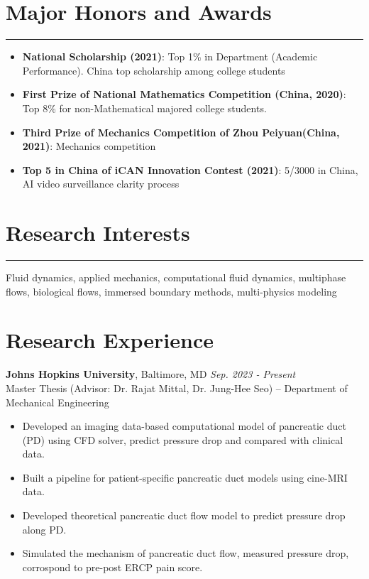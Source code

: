 \documentclass[11pt]{article}
\begin{document}
\vspace{6mm}

\section*{Major Honors and Awards}
\hrule

\begin{itemize}[leftmargin=*,itemsep=1pt]
    \item \textbf{National Scholarship (2021)}: Top 1\% in Department (Academic Performance). 
    China top scholarship among college students
    \item \textbf{First Prize of National Mathematics Competition (China, 2020)}: Top 8\% for non-Mathematical majored college students.
    \item \textbf{Third Prize of Mechanics Competition of Zhou Peiyuan(China, 2021)}: Mechanics competition 
    \item \textbf{Top 5 in China of iCAN Innovation Contest (2021)}: 5/3000 in China, AI video surveillance clarity process
\end{itemize}

\vspace{6mm}

\section*{Research Interests}
\hrule

\noindent Fluid dynamics, applied mechanics, computational fluid dynamics, multiphase flows, biological flows, immersed boundary methods, multi-physics modeling

\vspace{6mm}

\section*{Research Experience}
\noindent\textbf{Johns Hopkins University}, Baltimore, MD \hfill \textit{Sep. 2023 - Present} \\
Master Thesis (Advisor: Dr. Rajat Mittal, Dr. Jung-Hee Seo) – Department of Mechanical Engineering
\begin{itemize}[leftmargin=*,itemsep=1pt]

    \item Developed an imaging data-based computational model of pancreatic duct (PD) using CFD solver, predict pressure drop and compared with clinical data.
    \item Built a pipeline for patient-specific pancreatic duct models using cine-MRI data.
    \item Developed theoretical pancreatic duct flow model to predict pressure drop along PD.
    \item Simulated the mechanism of pancreatic duct flow, measured pressure drop, corrospond to pre-post ERCP pain score.
\end{itemize}
\end{document}
